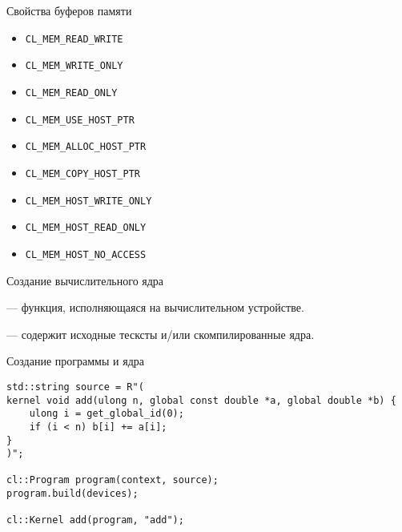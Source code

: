 \documentclass[@BEAMER_OPTIONS@]{beamer}
\newcommand{\code}[1]{\lstinline|#1|}
\begin{document}
\begin{frame}[fragile]{Свойства буферов памяти}
    \begin{itemize}
        \item \code{CL_MEM_READ_WRITE}
        \item \code{CL_MEM_WRITE_ONLY}
        \item \code{CL_MEM_READ_ONLY}
            \vspace{\baselineskip}
        \item \code{CL_MEM_USE_HOST_PTR}
        \item \code{CL_MEM_ALLOC_HOST_PTR}
        \item \code{CL_MEM_COPY_HOST_PTR}
            \vspace{\baselineskip}
        \item \code{CL_MEM_HOST_WRITE_ONLY}
        \item \code{CL_MEM_HOST_READ_ONLY}
        \item \code{CL_MEM_HOST_NO_ACCESS}
    \end{itemize}
\end{frame}

\begin{frame}[fragile]{Создание вычислительного ядра}
    \begin{description}[\;\;]
        \item[Ядро] --- функция, исполняющаяся на вычислительном устройстве.
        \item[Программа] --- содержит исходные тесксты и/или скомпилированные
            ядра.
    \end{description}
    \begin{exampleblock}{Создание программы и ядра}
        \begin{lstlisting}
std::string source = R"(
kernel void add(ulong n, global const double *a, global double *b) {
    ulong i = get_global_id(0);
    if (i < n) b[i] += a[i];
}
)";

cl::Program program(context, source);
program.build(devices);

cl::Kernel add(program, "add");
        \end{lstlisting}
    \end{exampleblock}
\end{frame}
\end{document}
